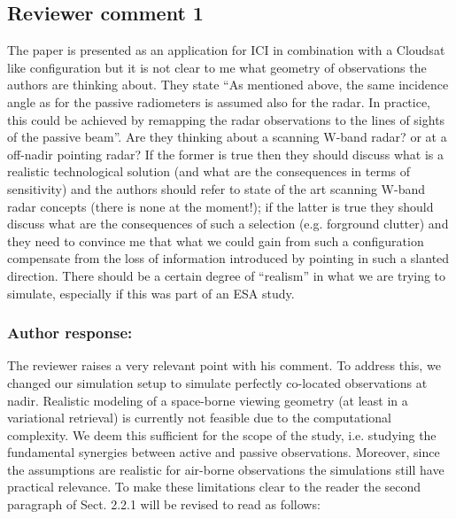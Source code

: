 \documentclass[11pt]{scrartcl}
\author{simon}
\date{\today}
\title{}
\begin{document}
\setlength{\parindent}{0cm}

\subsection*{Reviewer comment 1}

The paper is presented as an application for ICI in combination with a
Cloudsat like configuration but it is not clear to me what geometry of
observations the authors are thinking about. They state “As mentioned above, the
same incidence angle as for the passive radiometers is assumed also for the
radar. In practice, this could be achieved by remapping the radar observations to
the lines of sights of the passive beam”. Are they thinking about a scanning
W-band radar? or at a off-nadir pointing radar? If the former is true then they
should discuss what is a realistic technological solution (and what are the
consequences in terms of sensitivity) and the authors should refer to state of
the art scanning W-band radar concepts (there is none at the moment!); if the
latter is true they should discuss what are the consequences of such a selection
(e.g. forground clutter) and they need to convince me that what we could gain
from such a configuration compensate from the loss of information introduced by
pointing in such a slanted direction. There should be a certain degree of
“realism” in what we are trying to simulate, especially if this was part of an
ESA study.

\subsubsection*{Author response:}

The reviewer raises a very relevant point with his comment. To address this,
we changed our simulation setup to simulate perfectly co-located observations
at nadir. Realistic modeling of a space-borne viewing geometry (at least
in a variational retrieval) is currently not feasible due to the computational
complexity. We deem this sufficient for the scope of the study, i.e. studying
the fundamental synergies between active and passive observations. Moreover,
since the assumptions are realistic for air-borne observations the simulations
still have practical relevance. To make these limitations clear to the reader
the second paragraph of Sect. 2.2.1 will be revised to read as follows:
\end{document}
